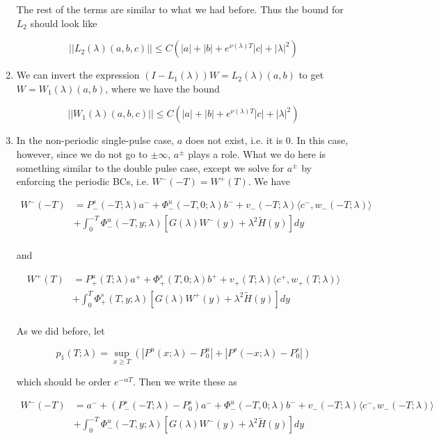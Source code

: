 \documentclass[12pt]{article}
\begin{document}
\begin{enumerate}
The rest of the terms are similar to what we had before. Thus the bound for $L_2$ should look like

\[
||L_2(\lambda)(a,b,c)|| \leq C (|a| + |b| + e^{\nu(\lambda)T}|c| + |\lambda|^2)
\]


\item We can invert the expression $(I - L_1(\lambda))W = L_2(\lambda)(a,b)$ to get $W = W_1(\lambda)(a,b)$, where we have the bound

\[
||W_1(\lambda)(a,b,c)|| \leq C (|a| + |b| + e^{\nu(\lambda)T}|c| + |\lambda|^2)
\]

\item In the non-periodic single-pulse case, $a$ does not exist, i.e. it is 0. In this case, however, since we do not go to $\pm \infty$, $a^\pm$ plays a role. What we do here is something similar to the double pulse case, except we solve for $a^\pm$ by enforcing the periodic BCs, i.e. $W^-(-T) = W^+(T)$. We have 


\begin{align*}
W^-(-T) &= P^s_-(-T; \lambda)a^- + \Phi^u_-(-T, 0; \lambda)b^- + v_-(-T; \lambda) \langle c^-, w_-(-T; \lambda) \rangle \\
&+ \int_0^{-T} \Phi^u_-(-T, y; \lambda)[ G(\lambda)W^-(y) + \lambda^2 \tilde{H}(y) ] dy \\
\end{align*}

and

\begin{align*}
W^+(T) &= P^u_+(T; \lambda)a^+ + \Phi^s_+(T, 0; \lambda)b^+ + v_+(T; \lambda) \langle c^+, w_+(T; \lambda) \rangle \\
&+ \int_0^T \Phi^s_+(T, y; \lambda) [ G(\lambda)W^+(y) + \lambda^2 \tilde{H}(y) ] dy \\
\end{align*}

As we did before, let

\[
p_1(T;\lambda) = \sup_{x \geq T} (|P^u(x;\lambda) - P_0^u| + |P^s(-x;\lambda) - P_0^s|)
\]

which should be order $e^{-\alpha T}$. Then we write these as

\begin{align*}
W^-(-T) &= a^- + (P^s_-(-T; \lambda) - P_0^s)a^- + \Phi^u_-(-T, 0; \lambda)b^- + v_-(-T; \lambda) \langle c^-, w_-(-T; \lambda) \rangle \\
&+ \int_0^{-T} \Phi^u_-(-T, y; \lambda)[ G(\lambda)W^-(y) + \lambda^2 \tilde{H}(y) ] dy \\
\end{align*}


\end{enumerate}
\end{document}
